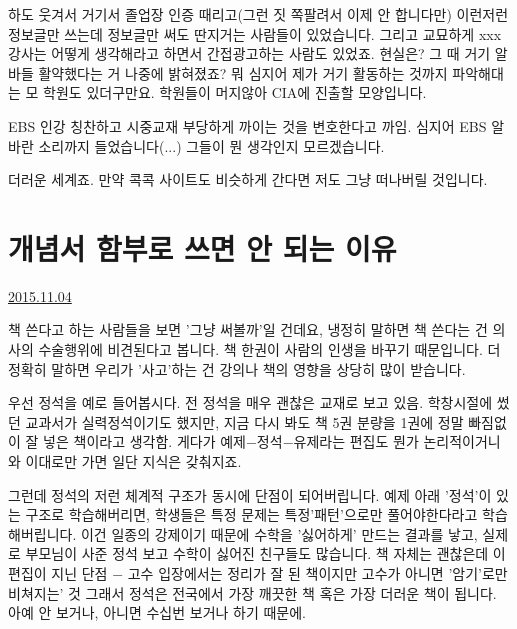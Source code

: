 하도 웃겨서 거기서 졸업장 인증 때리고(그런 짓 쪽팔려서 이제 안 합니다만) 이런저런 정보글만 쓰는데
정보글만 써도 딴지거는 사람들이 있었습니다. 그리고 교묘하게 xxx 강사는 어떻게 생각해라고 하면서 간접광고하는 사람도 있었죠.
현실은? 그 때 거기 알바들 활약했다는 거 나중에 밝혀졌죠?
뭐 심지어 제가 거기 활동하는 것까지 파악해대는 모 학원도 있더구만요.
학원들이 머지않아 CIA에 진출할 모양입니다.
\vspace{5mm}

EBS 인강 칭찬하고 시중교재 부당하게 까이는 것을 변호한다고 까임.
심지어 EBS 알바란 소리까지 들었습니다(...)
그들이 뭔 생각인지 모르겠습니다.
\vspace{5mm}

더러운 세계죠. 만약 콕콕 사이트도 비슷하게 간다면 저도 그냥 떠나버릴 것입니다.
\vspace{5mm}






\section{개념서 함부로 쓰면 안 되는 이유}
\href{https://www.kockoc.com/Apoc/462860}{2015.11.04}

\vspace{5mm}

책 쓴다고 하는 사람들을 보면 '그냥 써볼까'일 건데요, 냉정히 말하면 책 쓴다는 건 의사의 수술행위에 비견된다고 봅니다.
책 한권이 사람의 인생을 바꾸기 때문입니다. 더 정확히 말하면 우리가 '사고'하는 건 강의나 책의 영향을 상당히 많이 받습니다.
\vspace{5mm}

우선 정석을 예로 들어봅시다. 전 정석을 매우 괜찮은 교재로 보고 있음.
학창시절에 썼던 교과서가 실력정석이기도 했지만, 지금 다시 봐도 책 5권 분량을 1권에 정말 빠짐없이 잘 넣은 책이라고 생각함.
게다가 예제$-$정석$-$유제라는 편집도 뭔가 논리적이거니와 이대로만 가면 일단 지식은 갖춰지죠.
\vspace{5mm}

그런데 정석의 저런 체계적 구조가 동시에 단점이 되어버립니다.
예제 아래 '정석'이 있는 구조로 학습해버리면, 학생들은 특정 문제는 특정'패턴'으로만 풀어야한다라고 학습해버립니다.
이건 일종의 강제이기 때문에 수학을 '싫어하게' 만드는 결과를 낳고, 실제로 부모님이 사준 정석 보고 수학이 싫어진 친구들도 많습니다.
책 자체는 괜찮은데 이 편집이 지닌 단점 $-$ 고수 입장에서는 정리가 잘 된 책이지만 고수가 아니면 '암기'로만 비쳐지는' 것
그래서 정석은 전국에서 가장 깨끗한 책 혹은 가장 더러운 책이 됩니다.
아예 안 보거나, 아니면 수십번 보거나 하기 때문에.
\vspace{5mm}

